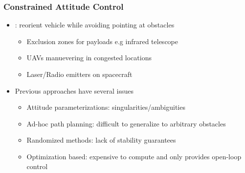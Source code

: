 \begin{frame}[t,noframenumbering]\frametitle{Constrained Attitude Control}
\label{slide:attitude_constraints}
    \begin{itemize}
    \item {} : reorient vehicle while avoiding pointing at obstacles
    \begin{itemize}
        \item Exclusion zones for payloads e.g infrared telescope
        \item UAVs manuevering in congested locations
        \item Laser/Radio emitters on spacecraft
    \end{itemize}
    \pause
    \vs
    \item Previous approaches have several issues
    \begin{itemize}
        \item Attitude parameterizations: singularities/ambiguities
        \item Ad-hoc path planning: difficult to generalize to arbitrary obstacles
        \item Randomized methods: lack of stability guarantees
        \item Optimization based: expensive to compute and only provides open-loop control  
    \end{itemize}
\end{itemize}


\end{frame}